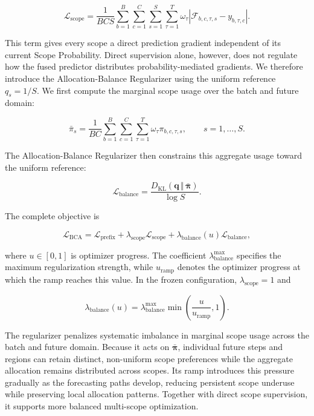 \documentclass[final,3p,times]{elsarticle}
\begin{document}
\begin{equation}
\mathcal L_{\mathrm{scope}}
=
\frac{1}{BCS}
\sum_{b=1}^{B}
\sum_{c=1}^{C}
\sum_{s=1}^{S}
\sum_{\tau=1}^{T}
\omega_\tau
\left|
\mathcal F_{b,c,\tau,s}-y_{b,\tau,c}
\right|.
\end{equation}


This term gives every scope a direct prediction gradient independent of its current Scope Probability. Direct supervision alone, however, does not regulate how the fused predictor distributes probability-mediated gradients. We therefore introduce the Allocation-Balance Regularizer using the uniform reference $q_s=1/S$. We first compute the marginal scope usage over the batch and future domain:

\begin{equation}
\bar{\pi}_s
=
\frac{1}{BC}
\sum_{b=1}^{B}
\sum_{c=1}^{C}
\sum_{\tau=1}^{T}
\omega_\tau\pi_{b,c,\tau,s},
\qquad
s=1,\ldots,S.
\end{equation}


The Allocation-Balance Regularizer then constrains this aggregate usage toward the uniform reference:

\begin{equation}
\mathcal L_{\mathrm{balance}}
=
\frac{
D_{\mathrm{KL}}\!\left(
\mathbf q\,\Vert\,\bar{\boldsymbol\pi}
\right)
}{
\log S
}.
\end{equation}


The complete objective is

\begin{equation}
\mathcal L_{\mathrm{BCA}}
=
\mathcal L_{\mathrm{prefix}}
+
\lambda_{\mathrm{scope}}
\mathcal L_{\mathrm{scope}}
+
\lambda_{\mathrm{balance}}(u)
\mathcal L_{\mathrm{balance}},
\end{equation}


where $u\in[0,1]$ is optimizer progress. The coefficient $\lambda_{\mathrm{balance}}^{\max}$ specifies the maximum regularization strength, while $u_{\mathrm{ramp}}$ denotes the optimizer progress at which the ramp reaches this value. In the frozen configuration, $\lambda_{\mathrm{scope}}=1$ and

\begin{equation}
\lambda_{\mathrm{balance}}(u)
=
\lambda_{\mathrm{balance}}^{\max}
\min\!\left(
\frac{u}{u_{\mathrm{ramp}}},1
\right).
\end{equation}


The regularizer penalizes systematic imbalance in marginal scope usage across the batch and future domain. Because it acts on $\bar{\boldsymbol\pi}$, individual future steps and regions can retain distinct, non-uniform scope preferences while the aggregate allocation remains distributed across scopes. Its ramp introduces this pressure gradually as the forecasting paths develop, reducing persistent scope underuse while preserving local allocation patterns. Together with direct scope supervision, it supports more balanced multi-scope optimization.
\end{document}
